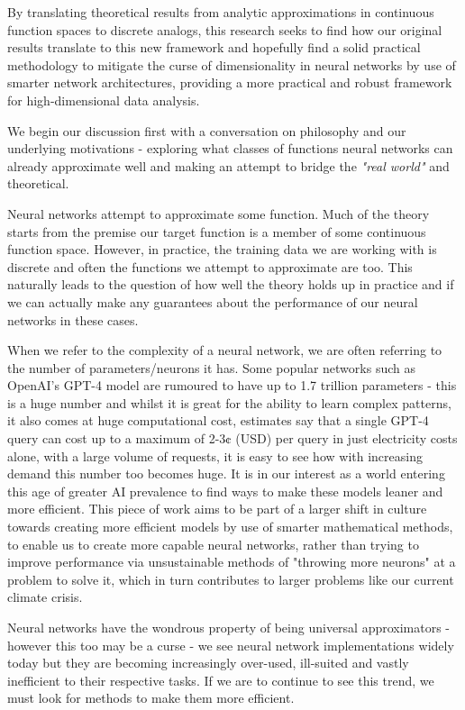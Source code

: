 \documentclass[11pt,a4paper]{article}
\begin{document}
By translating theoretical results from analytic approximations in continuous function spaces to discrete analogs, this research seeks to find how our original results translate to this new framework and hopefully find a solid practical methodology to mitigate the curse of dimensionality in neural networks by use of smarter network architectures, providing a more practical and robust framework for high-dimensional data analysis.

We begin our discussion first with a conversation on philosophy and our underlying motivations - exploring what classes of functions neural networks can already approximate well and making an attempt to bridge the \textit{"real world"} and theoretical.

Neural networks attempt to approximate some function. Much of the theory starts from the premise our target function is a member of some continuous function space. However, in practice, the training data we are working with is discrete and often the functions we attempt to approximate are too. This naturally leads to the question of how well the theory holds up in practice and if we can actually make any guarantees about the performance of our neural networks in these cases.

When we refer to the complexity of a neural network, we are often referring to the number of parameters/neurons it has. Some popular networks such as OpenAI's GPT-4 model are rumoured to have up to 1.7 trillion parameters - this is a huge number and whilst it is great for the ability to learn complex patterns, it also comes at huge computational cost, estimates say that a single GPT-4 query can cost up to a maximum of 2-3¢ (USD) per query in just electricity costs alone, with a large volume of requests, it is easy to see how with increasing demand this number too becomes huge. It is in our interest as a world entering this age of greater AI prevalence to find ways to make these models leaner and more efficient. This piece of work aims to be part of a larger shift in culture towards creating more efficient models by use of smarter mathematical methods, to enable us to create more capable neural networks, rather than trying to improve performance via unsustainable methods of "throwing more neurons" at a problem to solve it, which in turn contributes to larger problems like our current climate crisis. 

Neural networks have the wondrous property of being universal approximators - however this too may be a curse - we see neural network implementations widely today but they are becoming increasingly over-used, ill-suited and vastly inefficient to their respective tasks. If we are to continue to see this trend, we must look for methods to make them more efficient.
\end{document}
